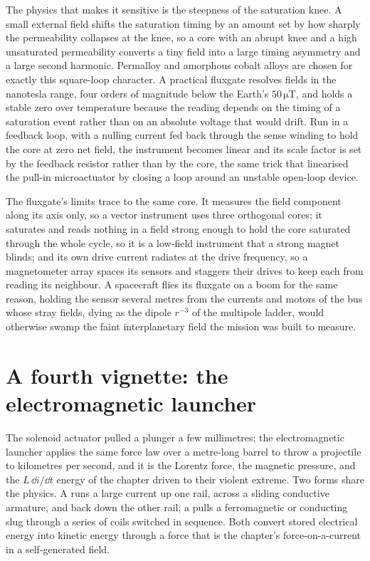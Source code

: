 The physics that makes it sensitive is the steepness of the saturation
knee. A small external field shifts the saturation timing by an amount set
by how sharply the permeability collapses at the knee, so a core with an
abrupt knee and a high unsaturated permeability converts a tiny field into a
large timing asymmetry and a large second harmonic. Permalloy and
amorphous cobalt alloys are chosen for exactly this square-loop character.
A practical fluxgate resolves fields in the nanotesla range, four orders of
magnitude below the Earth's $50\,\si{\micro\tesla}$, and holds a stable
zero over temperature because the reading depends on the timing of a
saturation event rather than on an absolute voltage that would drift. Run in
a feedback loop, with a nulling current fed back through the sense winding to
hold the core at zero net field, the instrument becomes linear and its scale
factor is set by the feedback resistor rather than by the core, the same
trick that linearised the pull-in microactuator by closing a loop around an
unstable open-loop device.

The fluxgate's limits trace to the same core. It measures the field
component along its axis only, so a vector instrument uses three orthogonal
cores; it saturates and reads nothing in a field strong enough to hold the
core saturated through the whole cycle, so it is a low-field instrument that
a strong magnet blinds; and its own drive current radiates at the drive
frequency, so a magnetometer array spaces its sensors and staggers their
drives to keep each from reading its neighbour. A spacecraft flies its
fluxgate on a boom for the same reason, holding the sensor several metres
from the currents and motors of the bus whose stray fields, dying as the
dipole $r^{-3}$ of the multipole ladder, would otherwise swamp the faint
interplanetary field the mission was built to measure.

\section{A fourth vignette: the electromagnetic launcher}

The solenoid actuator pulled a plunger a few millimetres; the electromagnetic
launcher applies the same force law over a metre-long barrel to throw a
projectile to kilometres per second, and it is the Lorentz force, the
magnetic pressure, and the $L\,\dd i/\dd t$ energy of the chapter driven to
their violent extreme. Two forms share the physics. A 
runs a large current up one rail, across a sliding conductive armature, and
back down the other rail; a  pulls a ferromagnetic or
conducting slug through a series of coils switched in sequence. Both convert
stored electrical energy into kinetic energy through a force that is the
chapter's force-on-a-current in a self-generated field.

